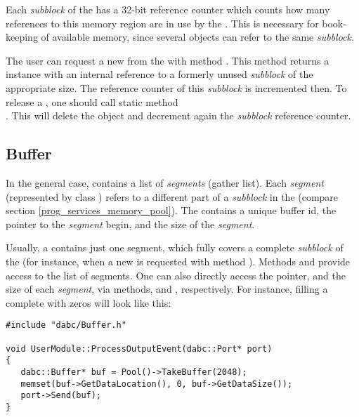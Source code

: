 Each {\em subblock} of the    has a 32-bit reference counter 
which counts how many references to this memory region are in use
by the . This is necessary for book-keeping of available
memory, since several  objects 
can refer to the same {\em subblock}.   

The user can request a new  from the  with method . This method returns a  instance 
with an internal reference to a formerly unused {\em subblock} 
of the appropriate size. The reference counter of this {\em subblock} is incremented
then. To release a , one should call static method \\ .  
This will delete the  object and decrement 
again the {\em subblock} reference counter.



\subsection{Buffer}
\label{prog_services_memory_buffer}
In the general case,  contains a list of {\em segments} (gather list).
Each {\em segment} (represented by class )
refers to a different part of a {\em subblock} in the 
(compare section \ref{prog_services_memory_pool}). The
 contains a unique buffer id, the pointer
to the {\em segment} begin, and the size of the {\em segment}. 



Usually, a  contains 
just one segment, which fully covers a complete {\em subblock} 
of the  (for instance, 
when a new  is requested with method ). 
Methods  and
 provide access to the list of segments. 
One can also directly access the pointer, and the size of each {\em segment}, via methods, and , respectively.
For instance, filling a complete  with zeros will look like this:  
 
\begin{small}
\begin{verbatim}     
#include "dabc/Buffer.h"

void UserModule::ProcessOutputEvent(dabc::Port* port)
{
   dabc::Buffer* buf = Pool()->TakeBuffer(2048);
   memset(buf->GetDataLocation(), 0, buf->GetDataSize());
   port->Send(buf);
}
\end{verbatim}     
\end{small}


